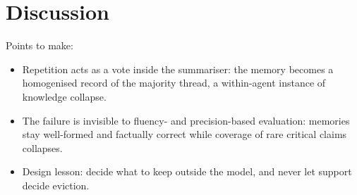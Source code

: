 \section{Discussion}
\label{sec:discussion}

Points to make:
\begin{itemize}
\item Repetition acts as a vote inside the summariser: the memory becomes a homogenised record of the majority thread, a within-agent instance of knowledge collapse.
\item The failure is invisible to fluency- and precision-based evaluation: memories stay well-formed and factually correct while coverage of rare critical claims collapses.
\item Design lesson: decide what to keep outside the model, and never let support decide eviction.
\end{itemize}
